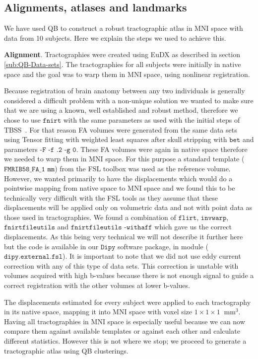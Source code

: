 \documentclass[preprint,authoryear,a4paper,10pt,onecolumn]{elsarticle}
\begin{document}
\subsection{Alignments, atlases and landmarks\label{sub:Atlases-made-easy}}

We have used QB to construct a robust tractographic atlas in MNI space
with data from 10 subjects. Here we explain the steps we used to achieve
this.

\textbf{Alignment}. Tractographies were created using EuDX as described
in section \ref{sub:QB-Data-sets}. The tractographies for all subjects
were initially in native space and the goal was to warp them in MNI
space, using nonlinear registration.

Because registration of brain anatomy between any two individuals is generally
considered a difficult problem with a non-unique solution we wanted to make sure
that we are using a known, well established and robust method, therefore we
chose to use $\texttt{fnirt}$ with the same parameters as used with the initial
steps of TBSS~\citep{Smith2006NeuroImage}. For that reason FA volumes were
generated from the same data sets using Tensor fitting with weighted least
squares after skull stripping with $\texttt{bet}$ and parameters $\texttt{-F -f
.2 -g 0}$. These FA volumes were again in native space therefore we needed to
warp them in MNI space. For this purpose a standard template
($\texttt{FMRIB58\_FA\_1~mm}$) from the FSL toolbox was used as the reference
volume. However, we wanted primarily to have the displacements which would do a
pointwise mapping from native space to MNI space and we found this to be
technically very difficult with the FSL tools as they assume that these
displacements will be applied only on volumetric data and not with point data as
those used in tractographies. We found a combination of $\texttt{flirt}$,
$\texttt{invwarp}$, $\texttt{fnirtfileutils}$ and $\texttt{fnirtfileutils
-withaff}$ which gave us the correct displacements. As this being very technical
we will not describe it further here but the code is available in our
$\texttt{Dipy}$ software package, in module ($\texttt{dipy.external.fsl}$). It
is important to note that we did not use eddy current correction with any of
this type of data sets. This correction is unstable with volumes acquired with
high b-values because there is not enough signal to guide a correct registration
with the other volumes at lower b-values.

The displacements estimated for every subject were applied
to each tractography in its native space, mapping it into MNI
space with voxel size $1\times1\times1~\textrm{~mm}^{3}$. Having all
tractographies in MNI space is especially useful because we can now
compare them against available templates or against each other and
calculate different statistics. However this is not where we stop; we
proceed to generate a tractographic atlas using QB clusterings.
\end{document}
